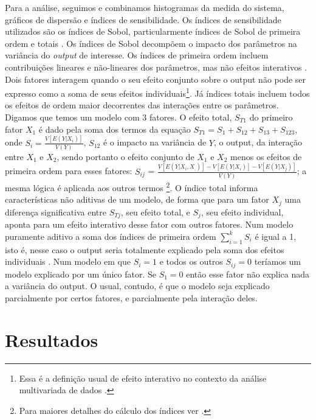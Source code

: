 Para a análise, seguimos  e combinamos
histogramas da medida do sistema, gráficos de dispersão e índices de
sensibilidade. Os índices de sensibilidade utilizados são os índices de Sobol,
particularmente índices de Sobol de primeira ordem e totais
\cite{saltelli2008global}. Os índices de Sobol decompõem o impacto dos
parâmetros na variância do \textit{output} de interesse. Os índices de primeira
ordem incluem contribuições lineares e não-lineares dos parâmetros, mas não
efeitos interativos \cite{ten2016sensitivity}. Dois fatores interagem quando o
seu efeito conjunto sobre o output não pode ser expresso como a soma de seus
efeitos individuais\footnote{Essa é a definição usual de efeito interativo no
  contexto da análise multivariada de dados \cite{hair2009analise}.}. Já índices
totais incluem todos os efeitos de ordem maior decorrentes das interações entre
os parâmetros. Digamos que temos um modelo com 3 fatores. O efeito total,
\(S_{T1}\) do primeiro fator \(X_1\) é dado pela soma dos termos da equação
\(S_{T1} = S_1 + S_{12} + S_{13} + S_{123}\), onde \(S_i =
\frac{V[E(Y|X_i)]}{V(Y)}\), \(S_{12}\) é o impacto na variância de \(Y\), o
output, da interação entre \(X_1\) e \(X_2\), sendo portanto o efeito conjunto
de \(X_1\) e \(X_2\) menos os efeitos de primeira ordem para esses fatores:
\(S_{ij}\) = \(\frac{V[E(Y|X_i,X_,)] - V[E(Y|X_i)] - V[E(Y|X_j)]}{V(Y)} \); a
mesma lógica é aplicada aos outros termos \footnote{ Para maiores detalhes do
  cálculo dos índices ver .}. O índice
total informa características não aditivas de um modelo, de forma que para um
fator \(X_j\) uma diferença significativa entre \(S_{Tj}\), seu efeito total, e
\(S_j\), seu efeito individual, aponta para um efeito interativo desse fator com
outros fatores. Num modelo puramente aditivo a soma dos índices de primeira
ordem \(\sum_{i=1}^k S_i\) é igual a 1, isto é, nesse caso o output seria
totalmente explicado pela soma dos efeitos individuais
\cite{saltelli2008global}. Num modelo em que \(S_i = 1\) e todos os outros
\(S_{ij} = 0\) teríamos um modelo explicado por um único fator. Se \(S_1 = 0\)
então esse fator não explica nada a variância do output. O usual, contudo, é que
o modelo seja explicado parcialmente por certos fatores, e parcialmente pela
interação deles.


\section{Resultados}

